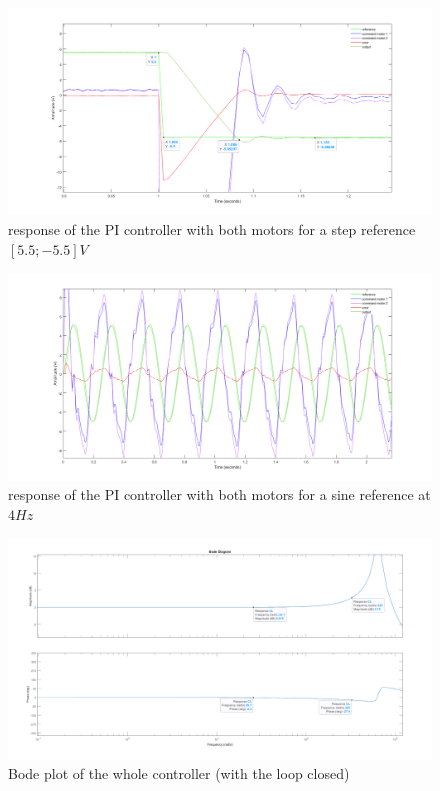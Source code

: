 \begin{figure}[H]
    \centering
    \includegraphics[width=\textwidth]{Pictures/stepRef_both.png}
    \caption{response of the PI controller with both motors for a step reference $[5.5; -5.5] V$}
    \label{fig:step reference for both}
\end{figure}
\begin{figure}[H]
    \centering
    \includegraphics[width=\textwidth]{Pictures/sinRef_both.png}
    \caption{response of the PI controller with both motors for a sine reference at $4 Hz$}
    \label{fig:sin reference for both}
\end{figure}
\begin{figure}[H]
    \centering
    \includegraphics[width=\textwidth]{Pictures/bode_CL_both.png}
    \caption{Bode plot of the whole controller (with the loop closed)}
    \label{fig:bode for whole PI}
\end{figure}
